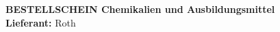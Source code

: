 \documentclass[a4paper,paper=landscape]{scrartcl}
\begin{document}
\begin{center}
\textbf{BESTELLSCHEIN Chemikalien und Ausbildungsmittel}\\
\textbf{Lieferant:} Roth
{
\small
{}
}
\end{center}
\end{document}
